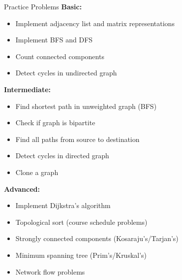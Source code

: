 \documentclass[aspectratio=169]{beamer}
\begin{document}
\begin{frame}{Practice Problems}
  \textbf{Basic:}
  \begin{itemize}
    \item Implement adjacency list and matrix representations
    \item Implement BFS and DFS
    \item Count connected components
    \item Detect cycles in undirected graph
  \end{itemize}

  \vspace{0.3cm}
  \textbf{Intermediate:}
  \begin{itemize}
    \item Find shortest path in unweighted graph (BFS)
    \item Check if graph is bipartite
    \item Find all paths from source to destination
    \item Detect cycles in directed graph
    \item Clone a graph
  \end{itemize}

  \vspace{0.3cm}
  \textbf{Advanced:}
  \begin{itemize}
    \item Implement Dijkstra's algorithm
    \item Topological sort (course schedule problems)
    \item Strongly connected components (Kosaraju's/Tarjan's)
    \item Minimum spanning tree (Prim's/Kruskal's)
    \item Network flow problems
  \end{itemize}
\end{frame}
\end{document}
